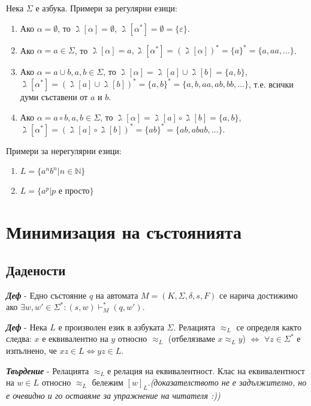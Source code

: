 \documentclass[fleqn,12pt]{article}
\begin{document}
\begin{flushleft}
Нека $\Sigma$ е азбука. Примери за регулярни езици:
\begin{enumerate}
    \item Ако $\alpha = \emptyset$, то $\gimel[\alpha] = \emptyset$, $\gimel[\alpha^*] = \emptyset = \{\varepsilon\}$.
    \item Ако $\alpha = a \in \Sigma$, то $\gimel[\alpha] = a, \gimel[\alpha^*] = (\gimel[\alpha])^* = \{a\}^* = \{a, aa, \dots\}$.
    \item Ако $\alpha = a \cup b, a, b \in \Sigma$, то $\gimel[\alpha] = \gimel[a] \cup \gimel[b] = \{a, b\}$, $\gimel[\alpha^*] = (\gimel[a] \cup \gimel[b])^* = \{a, b\}^* = \{a, b, aa, ab, bb, \dots\}$, т.е. всички думи съставени от $a$ и $b$.
    \item Ако $\alpha = a \circ b, a, b \in \Sigma$, то $\gimel[\alpha] = \gimel[a] \circ \gimel[b] = \{a, b\}$, $\gimel[\alpha^*] = (\gimel[a] \circ \gimel[b])^* = \{ab\}^* = \{ab, abab, \dots\}$.
\end{enumerate}

Примери за нерегулярни езици:
\begin{enumerate}
    \item $L = \{a^nb^n | n \in \mathbb{N}\}$
    \item $L = \{a^p | p$ е просто$\}$
\end{enumerate}

\section{Минимизация на състоянията}
\subsection{Дадености}

\textit{\textbf{Деф}} - Едно състояние $q$ на автомата $M = (K, \Sigma, \delta, s, F)$ се нарича достижимо ако $\exists w, w' \in \Sigma^*: (s, w) \vdash_M^* (q, w')$.

\textit{\textbf{Деф}} - Нека $L$ е произволен език в азбуката $\Sigma$. Релацията $\approx_L$ се определя както следва: $x$ е еквивалентно на $y$ относно $\approx_L$ (отбелязваме $x \approx_L y$) $\iff$ $\forall z \in \Sigma^*$ е изпълнено, че $xz \in L \iff yz \in L$.

\textit{\textbf{Твърдение}} - Релацията $\approx_L$е релация на еквивалентност. Клас на еквивалентност на $w \in L$ относно $\approx_L$ бележим $[w]_L$.\textit{(доказателството не е задължително, но е очевидно и го оставяме за упражнение на читателя :))}


\end{flushleft}
\end{document}
